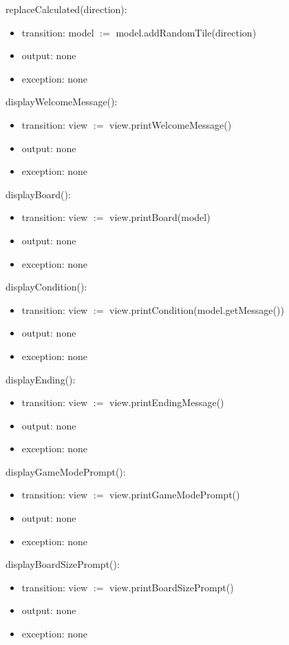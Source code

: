 \documentclass[12pt]{article}
\begin{document}
\noindent replaceCalculated(direction):
\begin{itemize}
  \item transition: model $:=$ model.addRandomTile(direction)
  \item output: none
  \item exception: none
\end{itemize}

\noindent displayWelcomeMessage():
\begin{itemize}
  \item transition: view $:=$ view.printWelcomeMessage()
  \item output: none
  \item exception: none
\end{itemize}

\noindent displayBoard():
\begin{itemize}
  \item transition: view $:=$ view.printBoard(model)
  \item output: none
  \item exception: none
\end{itemize}

\noindent displayCondition():
\begin{itemize}
  \item transition: view $:=$ view.printCondition(model.getMessage())
  \item output: none
  \item exception: none
\end{itemize}

\noindent displayEnding():
\begin{itemize}
  \item transition: view $:=$ view.printEndingMessage()
  \item output: none
  \item exception: none
\end{itemize}

\noindent displayGameModePrompt():
\begin{itemize}
  \item transition: view $:=$ view.printGameModePrompt()
  \item output: none
  \item exception: none
\end{itemize}

\noindent displayBoardSizePrompt():
\begin{itemize}
  \item transition: view $:=$ view.printBoardSizePrompt()
  \item output: none
  \item exception: none
\end{itemize}
\end{document}
